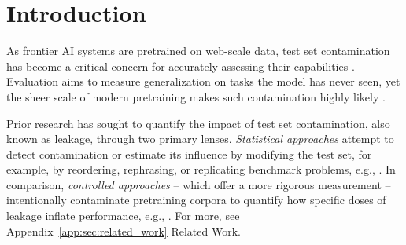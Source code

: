 \section{Introduction}
\label{sec:introduction}

As frontier AI systems are pretrained on web-scale data, test set contamination has become a critical concern for accurately assessing their capabilities \citep{sainz2023nlp,schaeffer2023pretrainingtestsetneed,xu2024benchmarkdatacontaminationlarge,deng2024unveiling,reuel2025open}. %
Evaluation aims to measure generalization on tasks the model has never seen, yet the sheer scale of modern pretraining makes such contamination highly likely \citep{brown2020language, du2022glam, wei2022finetuned,chowdhery2022palmscalinglanguagemodeling,touvron2023llama2openfoundation, penedo2024finewebdatasetsdecantingweb}.

Prior research has sought to quantify the impact of test set contamination, also known as leakage, through two primary lenses. \textit{Statistical approaches} attempt to detect contamination or estimate its influence by modifying the test set, for example, by reordering, rephrasing, or replicating benchmark problems, e.g., \citep{oren2023proving, ni2025trainingbenchmarkneed, shi2024detecting, golchin2023data,golchin2024time,roberts2024to, wang2025generalization, zhang2024carefulexaminationlargelanguage}.
In comparison, \textit{controlled approaches} -- which offer a more rigorous measurement -- intentionally contaminate pretraining corpora to quantify how specific doses of leakage inflate performance, e.g., \citep{magar2022data,jiang2024investigatingdatacontaminationpretraining,oren2023proving,yao2024data, duan2024membership,wang2025generalization,kocyigit2025overestimation,bordt2025howmuch, wei2025hubblemodelsuiteadvance}.
For more, see Appendix~\ref{app:sec:related_work} Related Work.

